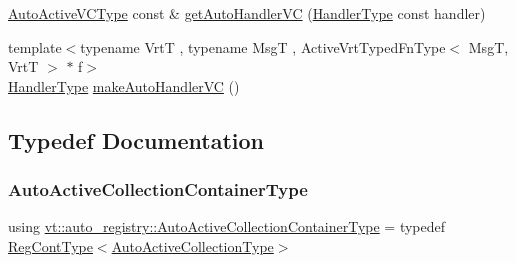 \begin{DoxyCompactItemize}
\item 
\hyperlink{namespacevt_1_1auto__registry_a3e4aadbe33ef7af6d8b87f72876aee41}{Auto\+Active\+V\+C\+Type} const  \& \hyperlink{namespacevt_1_1auto__registry_a275efac0694c523b38a098c103ef63f9}{get\+Auto\+Handler\+VC} (\hyperlink{namespacevt_af64846b57dfcaf104da3ef6967917573}{Handler\+Type} const handler)
\item 
{\footnotesize template$<$typename VrtT , typename MsgT , Active\+Vrt\+Typed\+Fn\+Type$<$ Msg\+T, Vrt\+T $>$ $\ast$ f$>$ }\\\hyperlink{namespacevt_af64846b57dfcaf104da3ef6967917573}{Handler\+Type} \hyperlink{namespacevt_1_1auto__registry_a196f413473a495e5a3762d1bd95a2648}{make\+Auto\+Handler\+VC} ()
\end{DoxyCompactItemize}


\subsection{Typedef Documentation}
\mbox{\label{namespacevt_1_1auto__registry_a6d9b82aa23fd781ab64b6b4e55a4c94f}} 
\subsubsection{\texorpdfstring{Auto\+Active\+Collection\+Container\+Type}{AutoActiveCollectionContainerType}}
{\footnotesize\ttfamily using \hyperlink{namespacevt_1_1auto__registry_a6d9b82aa23fd781ab64b6b4e55a4c94f}{vt\+::auto\+\_\+registry\+::\+Auto\+Active\+Collection\+Container\+Type} = typedef \hyperlink{namespacevt_1_1auto__registry_a988a4943e4c8fe82b56f5b13bddceb2b}{Reg\+Cont\+Type}$<$\hyperlink{namespacevt_1_1auto__registry_a14267fe1eee84b3f2205aecac48cafe4}{Auto\+Active\+Collection\+Type}$>$}

\mbox{\label{namespacevt_1_1auto__registry_a2843152c64eb58ed89991d1d2ae2c3f1}} 
